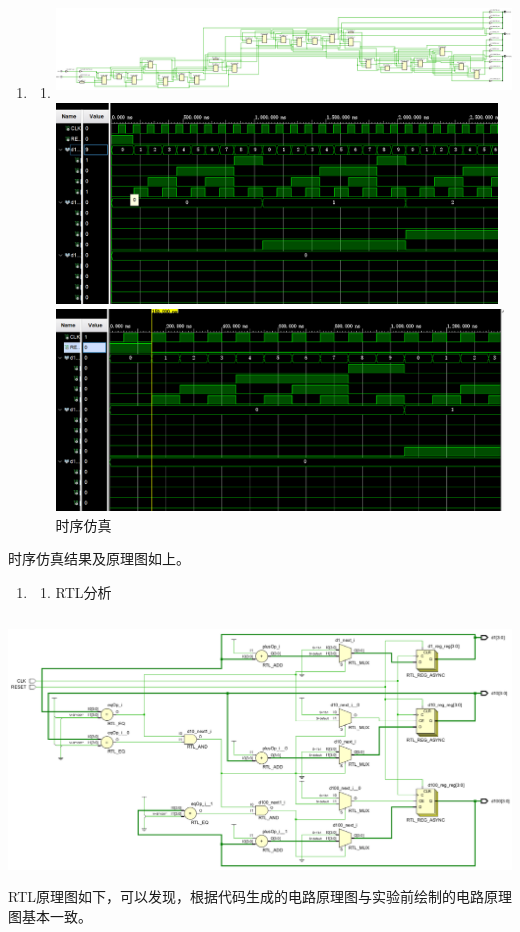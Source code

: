 \documentclass{article} %
\begin{document}
\begin{enumerate}
    \item \begin{enumerate}
              \item  \includegraphics*[width=5.72in, height=1.02in]{image7}\includegraphics*[width=4.61in, height=2.10in]{image8}\includegraphics*[width=4.67in, height=2.11in]{image9}时序仿真
          \end{enumerate}
\end{enumerate}

时序仿真结果及原理图如上。

\begin{enumerate}
    \item \begin{enumerate}
              \item  RTL分析
          \end{enumerate}
\end{enumerate}

\includegraphics*[width=5.77in, height=2.77in]{image10}RTL原理图如下，可以发现，根据代码生成的电路原理图与实验前绘制的电路原理图基本一致。
\end{document}
